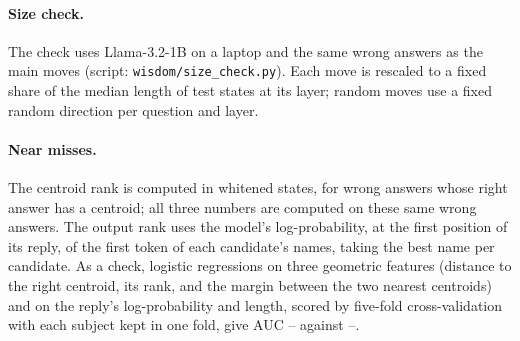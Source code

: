\paragraph{Size check.} The check uses Llama-3.2-1B on a laptop and the same \SizeN{} wrong answers as the main moves (script: \texttt{wisdom/size\_check.py}). Each move is rescaled to a fixed share of the median length of test states at its layer; random moves use a fixed random direction per question and layer.

\paragraph{Near misses.} The centroid rank is computed in whitened states, for wrong answers whose right answer has a centroid; all three numbers are computed on these same wrong answers. The output rank uses the model's log-probability, at the first position of its reply, of the first token of each candidate's names, taking the best name per candidate. As a check, logistic regressions on three geometric features (distance to the right centroid, its rank, and the margin between the two nearest centroids) and on the reply's log-probability and length, scored by five-fold cross-validation with each subject kept in one fold, give AUC \AucGeoMin{}--\AucGeoMax{} against \AucConfMin{}--\AucConfMax{}.
